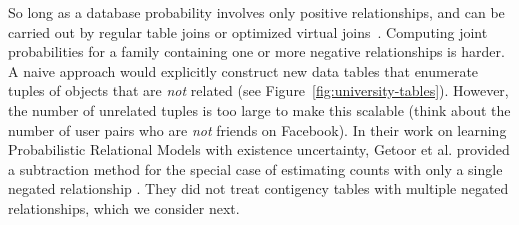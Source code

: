 \documentclass{article}
\begin{document}
So long as a database probability involves only positive relationships,
and can be carried out by regular table joins or optimized virtual joins~\cite{Yin2004}. 
%
Computing joint probabilities for a family containing one or more negative relationships is harder. A naive approach would explicitly construct new data tables that enumerate tuples of objects that are {\em not} related (see Figure~\ref{fig:university-tables}).
However, the number of unrelated tuples is too large to make this scalable (think about the number of user pairs who are {\em not} friends on Facebook). 
In their work on learning Probabilistic Relational Models with existence  uncertainty, Getoor et al. provided a subtraction method for the special case of estimating counts with only a single negated relationship \cite[Sec.5.8.4.2]{Getoor2007c}. They did not treat contigency tables with multiple negated relationships, which we consider next.
\end{document}
